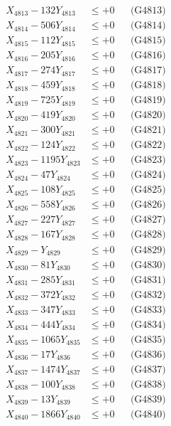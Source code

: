 \documentclass[a4paper,10pt]{article}
\begin{document}
{\begin{align}
X_{4813} - 132Y_{4813} &\leq +0 && \text{(G4813)} \\
X_{4814} - 506Y_{4814} &\leq +0 && \text{(G4814)} \\
X_{4815} - 112Y_{4815} &\leq +0 && \text{(G4815)} \\
X_{4816} - 205Y_{4816} &\leq +0 && \text{(G4816)} \\
X_{4817} - 274Y_{4817} &\leq +0 && \text{(G4817)} \\
X_{4818} - 459Y_{4818} &\leq +0 && \text{(G4818)} \\
X_{4819} - 725Y_{4819} &\leq +0 && \text{(G4819)} \\
X_{4820} - 419Y_{4820} &\leq +0 && \text{(G4820)} \\
\allowbreak
X_{4821} - 300Y_{4821} &\leq +0 && \text{(G4821)} \\
X_{4822} - 124Y_{4822} &\leq +0 && \text{(G4822)} \\
X_{4823} - 1195Y_{4823} &\leq +0 && \text{(G4823)} \\
X_{4824} - 47Y_{4824} &\leq +0 && \text{(G4824)} \\
X_{4825} - 108Y_{4825} &\leq +0 && \text{(G4825)} \\
X_{4826} - 558Y_{4826} &\leq +0 && \text{(G4826)} \\
X_{4827} - 227Y_{4827} &\leq +0 && \text{(G4827)} \\
X_{4828} - 167Y_{4828} &\leq +0 && \text{(G4828)} \\
X_{4829} - Y_{4829} &\leq +0 && \text{(G4829)} \\
X_{4830} - 81Y_{4830} &\leq +0 && \text{(G4830)} \\
\allowbreak
X_{4831} - 285Y_{4831} &\leq +0 && \text{(G4831)} \\
X_{4832} - 372Y_{4832} &\leq +0 && \text{(G4832)} \\
X_{4833} - 347Y_{4833} &\leq +0 && \text{(G4833)} \\
X_{4834} - 444Y_{4834} &\leq +0 && \text{(G4834)} \\
X_{4835} - 1065Y_{4835} &\leq +0 && \text{(G4835)} \\
X_{4836} - 17Y_{4836} &\leq +0 && \text{(G4836)} \\
X_{4837} - 1474Y_{4837} &\leq +0 && \text{(G4837)} \\
X_{4838} - 100Y_{4838} &\leq +0 && \text{(G4838)} \\
X_{4839} - 13Y_{4839} &\leq +0 && \text{(G4839)} \\
X_{4840} - 1866Y_{4840} &\leq +0 && \text{(G4840)} \\

\end{align}}
\end{document}
